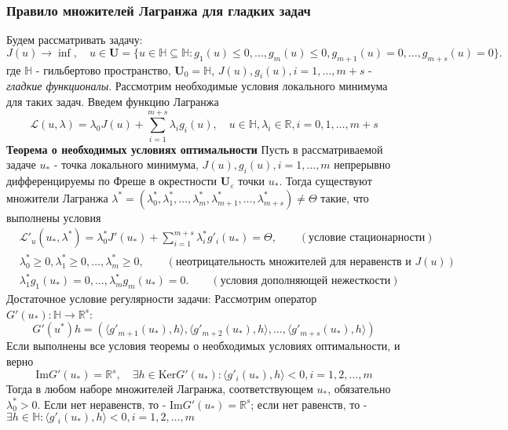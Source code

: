 \documentclass[A4]{article}
\begin{document}
\subsubsection{Правило множителей Лагранжа для гладких задач}
Будем рассматривать задачу:
\begin{equation*}
J(u)\rightarrow\inf,\quad u\in\mathbf{U}=\{u\in\mathbb{H}\subseteq\mathbb{H}:g_1(u)\leqslant 0,\ldots,g_m(u)\leqslant 0,g_{m+1}(u)=0,\ldots,g_{m+s}(u)=0 \}.
\end{equation*}
где $\mathbb{H}$ - гильбертово пространство, $\mathbf{U}_0=\mathbb{H}$, $J(u),g_i(u),i=1,\ldots,m+s$ - \emph{гладкие функционалы}. Рассмотрим необходимые условия локального минимума для таких задач.
Введем функцию Лагранжа
\begin{equation*}
\mathcal{L}(u,\lambda) =\lambda_0 J(u)+\sum_{i=1}^{m+s}\lambda_ig_i(u),\quad u\in\mathbb{H},\lambda_i\in\mathbb{R},i=0,1,\ldots,m+s
\end{equation*}
\textbf{Теорема о необходимых условиях оптимальности} Пусть в рассматриваемой задаче $u_*$ - точка локального минимума, $J(u),g_i(u),i=1,\ldots,m$ непрерывно дифференцируемы по Фреше в окрестности $\mathbf{U}_{\varepsilon}$ точки $u_*$. Тогда существуют множители Лагранжа $\lambda^*=(\lambda_0^*,\lambda_1^*,\ldots,\lambda_m^*,\lambda_{m+1}^*,\ldots,\lambda_{m+s}^*)\ne\Theta$ такие, что выполнены условия
\begin{equation*}
\begin{aligned}
&\mathcal{L}'_{u}(u_*,\lambda^*)=\lambda_0^*J'(u_*)+\sum_{i=1}^{m+s}\lambda_i^*g'_i(u_*)=\Theta,\qquad(\text{условие стационарности}) \\
&\lambda_0^*\geqslant 0,\lambda_1^*\geqslant 0,\ldots,\lambda_m^*\geqslant 0,\qquad(\text{неотрицательность множителей для неравенств и } J(u))\\
&\lambda_1^*g_1(u_*)=0,\ldots,\lambda_m^*g_m(u_*)=0. \qquad(\text{условия дополняющей нежесткости})
\end{aligned}
\end{equation*}
Достаточное условие регулярности задачи: Рассмотрим оператор $G'(u_*):\mathbb{H}\rightarrow \mathbb{R}^s$:
\begin{equation*}
G'(u^*)h=(\langle g'_{m+1}(u_*),h\rangle,\langle g'_{m+2}(u_*),h\rangle,\ldots,\langle g'_{m+s}(u_*),h\rangle)
\end{equation*}
Если выполнены все условия теоремы о необходимых условиях оптимальности, и верно
\begin{equation*}
\text{Im} G'(u_*)=\mathbb{R}^s,\quad \exists h\in\text{Ker}G'(u_*):\langle g'_i(u_*),h\rangle<0,i=1,2,\ldots,m
\end{equation*} 
Тогда в любом наборе множителей Лагранжа, соответствующем $u_*$, обязательно $\lambda_0^*>0$. Если нет неравенств, то  - $\text{Im}G'(u_*)=\mathbb{R}^s$; если нет равенств, то - $\exists h\in\mathbb{H}:\langle g'_i(u_*),h\rangle<0,i=1,2,\ldots,m$ 
\end{document}
